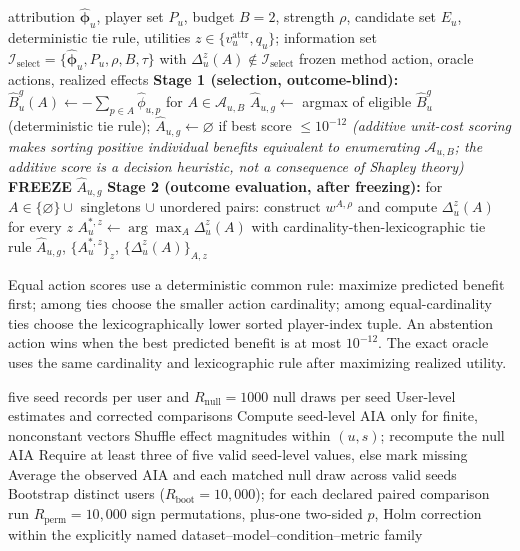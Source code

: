 \documentclass[manuscript,screen,review,anonymous]{acmart}
\begin{document}
\begin{algorithm}[t]
\caption{Leakage-free signed action selection and exact budget-two oracle}
\label{alg:actions}
\begin{algorithmic}[1]
\Require attribution $\hat{\boldsymbol\phi}_u$, player set $P_u$, budget $B=2$, strength $\rho$, candidate set $E_u$, deterministic tie rule, utilities $z\in\{v_u^{\mathrm{attr}},q_u\}$; information set $\mathcal I_{\mathrm{select}}=\{\hat{\boldsymbol\phi}_u,P_u,\rho,B,\tau\}$ with $\Delta_u^z(A)\notin\mathcal I_{\mathrm{select}}$
\Ensure frozen method action, oracle actions, realized effects
\State \textbf{Stage 1 (selection, outcome-blind):} $\widehat B_u^g(A)\gets-\sum_{p\in A}\hat\phi_{u,p}$ for $A\in\mathcal A_{u,B}$
\State $\widehat A_{u,g}\gets$ argmax of eligible $\widehat B_u^g$ (deterministic tie rule); $\widehat A_{u,g}\gets\varnothing$ if best score $\le10^{-12}$
\Statex\hspace{1em}\textit{(additive unit-cost scoring makes sorting positive individual benefits equivalent to enumerating $\mathcal A_{u,B}$; the additive score is a decision heuristic, not a consequence of Shapley theory)}
\State \textbf{FREEZE} $\widehat A_{u,g}$
\State \textbf{Stage 2 (outcome evaluation, after freezing):} for $A\in\{\varnothing\}\cup$ singletons $\cup$ unordered pairs: construct $w^{A,\rho}$ and compute $\Delta_u^z(A)$ for every $z$
\State $A_u^{*,z}\gets\arg\max_A\Delta_u^z(A)$ with cardinality-then-lexicographic tie rule
\State \Return $\widehat A_{u,g}$, $\{A_u^{*,z}\}_z$, $\{\Delta_u^z(A)\}_{A,z}$
\end{algorithmic}
\end{algorithm}

Equal action scores use a deterministic common rule: maximize predicted benefit first; among ties choose the smaller action cardinality; among equal-cardinality ties choose the lexicographically lower sorted player-index tuple. An abstention action wins when the best predicted benefit is at most $10^{-12}$. The exact oracle uses the same cardinality and lexicographic rule after maximizing realized utility.

\begin{algorithm}[t]
\caption{Distinct-user inference and AIA null}
\label{alg:inference}
\begin{algorithmic}[1]
\Require five seed records per user and $R_{\mathrm{null}}=1000$ null draws per seed
\Ensure User-level estimates and corrected comparisons
\State Compute seed-level AIA only for finite, nonconstant vectors
\State Shuffle effect magnitudes within $(u,s)$; recompute the null AIA
\EndFor
\EndFor
{}
\State Require at least three of five valid seed-level values, else mark missing
\State Average the observed AIA and each matched null draw across valid seeds
\EndFor
\State Bootstrap distinct users ($R_{\mathrm{boot}}=10{,}000$); for each declared paired comparison run $R_{\mathrm{perm}}=10{,}000$ sign permutations, plus-one two-sided $p$, Holm correction within the explicitly named dataset--model--condition--metric family
\end{algorithmic}
\end{algorithm}
\end{document}
